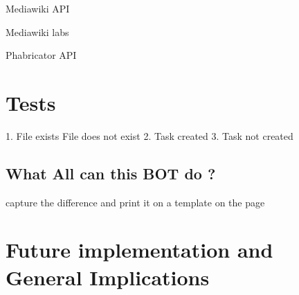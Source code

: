 Mediawiki API

Mediawiki labs

Phabricator API


\section{Tests}
1. File exists
File does not exist
2. Task created
3. Task not created

\subsection{What All can this BOT do ?}
capture the difference and print it on a template on the page


\section{Future implementation and General Implications }

		

